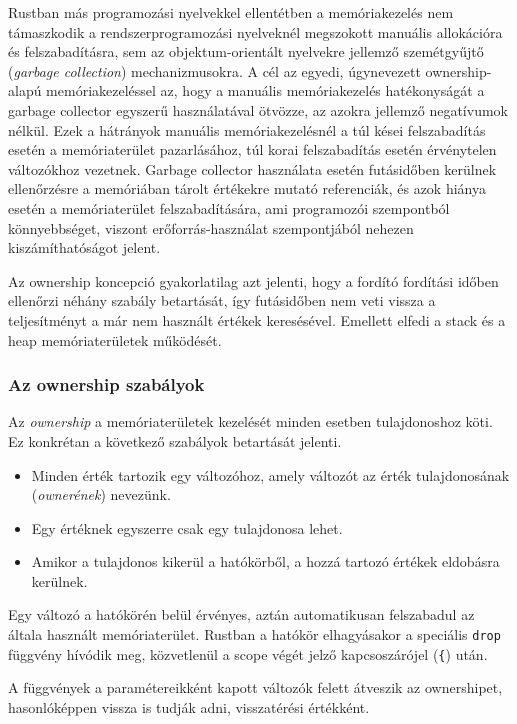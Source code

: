 Rustban más programozási nyelvekkel ellentétben a memóriakezelés nem támaszkodik a rendszerprogramozási nyelveknél megszokott manuális allokációra és felszabadításra, sem az objektum-orientált nyelvekre jellemző szemétgyűjtő (\textit{garbage collection}) mechanizmusokra. A cél az egyedi, úgynevezett ownership-alapú memóriakezeléssel az, hogy a manuális memóriakezelés hatékonyságát a garbage collector egyszerű használatával ötvözze, az azokra jellemző negatívumok nélkül. Ezek a hátrányok manuális memóriakezelésnél a túl kései felszabadítás esetén a memóriaterület pazarlásához, túl korai felszabadítás esetén érvénytelen változókhoz vezetnek. Garbage collector használata esetén futásidőben kerülnek ellenőrzésre a memóriában tárolt értékekre mutató referenciák, és azok hiánya esetén a memóriaterület felszabadítására, ami programozói szempontból könnyebbséget, viszont erőforrás-használat szempontjából nehezen kiszámíthatóságot jelent.

Az ownership koncepció gyakorlatilag azt jelenti, hogy a fordító fordítási időben ellenőrzi néhány szabály betartását, így futásidőben nem veti vissza a teljesítményt a már nem használt értékek keresésével. Emellett elfedi a stack és a heap memóriaterületek működését.

\subsubsection{Az ownership szabályok}

Az \textit{ownership} a memóriaterületek kezelését minden esetben tulajdonoshoz köti. Ez konkrétan a következő szabályok betartását jelenti.
\begin{itemize}
  \item Minden érték tartozik egy változóhoz, amely változót az érték tulajdonosának (\textit{ownerének}) nevezünk.
  \item Egy értéknek egyszerre csak egy tulajdonosa lehet.
  \item Amikor a tulajdonos kikerül a hatókörből, a hozzá tartozó értékek eldobásra kerülnek.
\end{itemize}

Egy változó a hatókörén belül érvényes, aztán automatikusan felszabadul az általa használt memóriaterület. Rustban a hatókör elhagyásakor a speciális \lstinline{drop} függvény hívódik meg, közvetlenül a scope végét jelző kapcsoszárójel (\lstinline{{}) után.

A függvények a paramétereikként kapott változók felett átveszik az ownershipet, hasonlóképpen vissza is tudják adni, visszatérési értékként.


